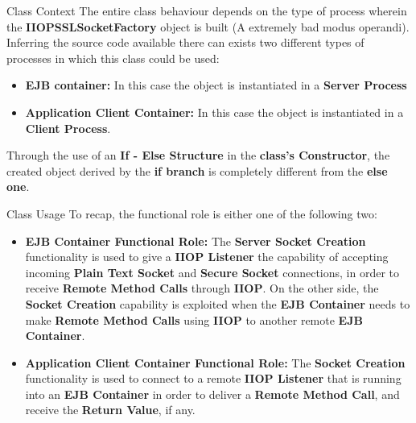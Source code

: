 \documentclass{../common/latex_classes/pdf_presentation}
\begin{document}
		\begin{frame}{Class Context}
			The entire class behaviour depends on the type of process wherein the \textbf{IIOPSSLSocketFactory} object is built (A extremely bad modus operandi).
			Inferring the source code available there can exists two different types of processes in which this class could be used:
			\begin{itemize}
				\item \textbf{EJB container:} In this case the object is instantiated in a \textbf{Server Process}
				\item \textbf{Application Client Container:}
				In this case the object is instantiated in a \textbf{Client Process}.
			\end{itemize}
			Through the use of an \textbf{If - Else Structure} in the \textbf{class's Constructor}, the created object derived by the \textbf{if branch} is completely different from the \textbf{else one}.
			
			\end{frame}
			
			\begin{frame}{Class Usage}
			To recap, the functional role is either one of the following two:
			\begin{itemize}
				\item \textbf{EJB Container Functional Role:}
				The \textbf{Server Socket Creation} functionality is used to give a \textbf{IIOP Listener} the capability of accepting incoming \textbf{Plain Text Socket} and \textbf{Secure Socket} connections, in order to receive \textbf{Remote Method Calls} through \textbf{IIOP}.
				On the other side, the \textbf{Socket Creation} capability is exploited when the \textbf{EJB Container} needs to make \textbf{Remote Method Calls} using \textbf{IIOP} to another remote \textbf{EJB Container}.
				\item \textbf{Application Client Container Functional Role:}
				The \textbf{Socket Creation} functionality is used to connect to a remote \textbf{IIOP Listener} that is running into an \textbf{EJB Container} in order to deliver a \textbf{Remote Method Call}, and receive the \textbf{Return Value}, if any.
			\end{itemize}
		\end{frame}
	
\end{document}
